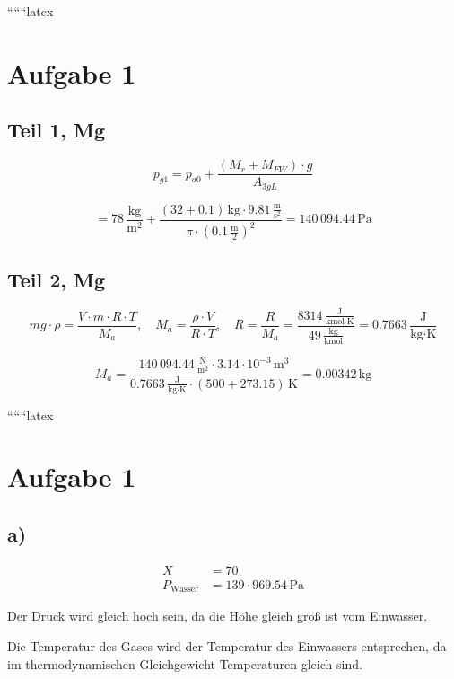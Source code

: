 
``````latex


\section*{Aufgabe 1}

\subsection*{Teil 1, Mg}

\[
p_{g1} = p_{a0} + \frac{(M_r + M_{FW}) \cdot g}{A_{3gL}}
\]

\[
= 78 \, \frac{\text{kg}}{\text{m}^2} + \frac{(32 + 0.1) \, \text{kg} \cdot 9.81 \, \frac{\text{m}}{\text{s}^2}}{\pi \cdot (0.1 \, \frac{\text{m}}{2})^2} = 140 \, 094.44 \, \text{Pa}
\]

\subsection*{Teil 2, Mg}

\[
mg \cdot \rho = \frac{V \cdot m \cdot R \cdot T}{M_a}, \quad M_a = \frac{\rho \cdot V}{R \cdot T}, \quad R = \frac{R}{M_a} = \frac{8314 \, \frac{\text{J}}{\text{kmol} \cdot \text{K}}}{49 \, \frac{\text{kg}}{\text{kmol}}} = 0.7663 \, \frac{\text{J}}{\text{kg} \cdot \text{K}}
\]

\[
M_a = \frac{140 \, 094.44 \, \frac{\text{N}}{\text{m}^2} \cdot 3.14 \cdot 10^{-3} \, \text{m}^3}{0.7663 \, \frac{\text{J}}{\text{kg} \cdot \text{K}} \cdot (500 + 273.15) \, \text{K}} = 0.00342 \, \text{kg}
\]

``````latex


\section*{Aufgabe 1}

\subsection*{a)}

\begin{align*}
X & = 70 \\
P_{\text{Wasser}} & = 139 \cdot 969.54 \, \text{Pa}
\end{align*}

Der Druck wird gleich hoch sein, da die Höhe gleich groß ist vom Einwasser.

Die Temperatur des Gases wird der Temperatur des Einwassers entsprechen, da im thermodynamischen Gleichgewicht Temperaturen gleich sind.

